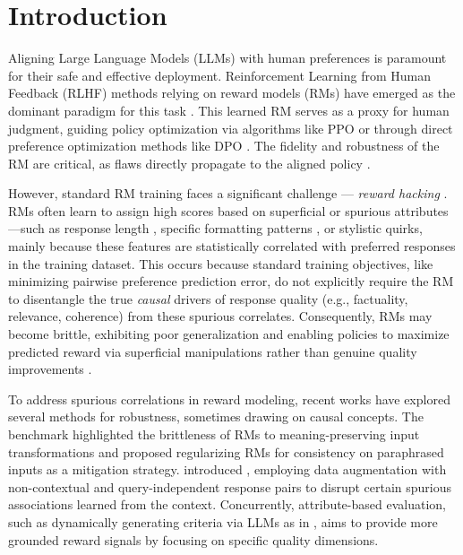 \section{Introduction}
\label{sec:introduction}

Aligning Large Language Models (LLMs) with human preferences is paramount for their safe and effective deployment. Reinforcement Learning from Human Feedback (RLHF) methods relying on reward models (RMs) have emerged as the dominant paradigm for this task \citep{christiano2017deep, ouyang2022training, bai2022training,schulman2017proximal,shao2024deepseekmath}. 
This learned RM serves as a proxy for human judgment, guiding policy optimization via algorithms like PPO \citep{schulman2017proximal} or through direct preference optimization methods like DPO \citep{rafailov2024direct}. The fidelity and robustness of the RM are critical, as flaws directly propagate to the aligned policy \citep{casper2023open}.

However, standard RM training faces a significant challenge --- \textit{reward hacking} \citep{gao2023scaling, skalse2022defining}. RMs often learn to assign high scores based on superficial or spurious attributes—such as response length \citep{singhal2023long}, specific formatting patterns \citep{zhang2024lists}, or stylistic quirks, mainly because these features are statistically correlated with preferred responses in the training dataset. This occurs because standard training objectives, like minimizing pairwise preference prediction error, do not explicitly require the RM to disentangle the true \textit{causal} drivers of response quality (e.g., factuality, relevance, coherence) from these spurious correlates. Consequently, RMs may become brittle, exhibiting poor generalization and enabling policies to maximize predicted reward via superficial manipulations rather than genuine quality improvements \citep{shen2023trickle, eisenstein2023helping}.

To address spurious correlations in reward modeling, recent works have explored several methods for robustness, sometimes drawing on causal concepts. The \rewordbench{} benchmark \citep{wu2025rewordbench} highlighted the brittleness of RMs to meaning-preserving input transformations and proposed regularizing RMs for consistency on paraphrased inputs as a mitigation strategy. \citet{liu2024rrm} introduced \rrm, employing data augmentation with non-contextual and query-independent response pairs to disrupt certain spurious associations learned from the context. Concurrently, attribute-based evaluation, such as dynamically generating criteria via LLMs as in \carmo{} \citep{gupta2025carmodynamiccriteriageneration}, aims to provide more grounded reward signals by focusing on specific quality dimensions.


